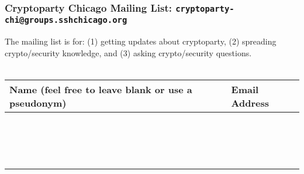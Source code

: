 \documentclass[8pt]{beamer}
\begin{document}
\begin{frame}
\frametitle{Cryptoparty Chicago Mailing List: \texttt{cryptoparty-chi@groups.sshchicago.org}}

The mailing list is for: (1) getting updates about cryptoparty, (2) spreading crypto/security knowledge, and (3) asking crypto/security questions.
\\~\\

\begin{tabular}{p{4 cm} | p{6 cm}}
\textbf{Name} \small (feel free to leave blank or use a pseudonym) & \textbf{Email Address} \\\hline
 & \\\hline
 & \\\hline
 & \\\hline
 & \\\hline
 & \\\hline
 & \\\hline
 & \\\hline
 & \\\hline
 & \\\hline
 & \\\hline
 & \\\hline
 & \\\hline
 & \\\hline
 & \\\hline
 & \\\hline
 & \\\hline
\end{tabular}

\end{frame}
\end{document}
